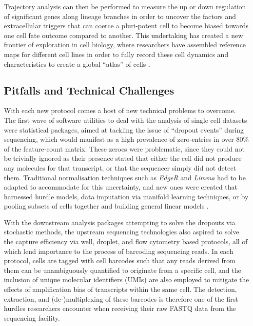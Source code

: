 \documentclass[a4paper,num-refs]{oup-contemporary}
\newcommand{\prog}[1]{\textit{#1}}
\begin{document}
Trajectory analysis can then be performed to measure the up or down regulation of significant genes along lineage branches in order to uncover the factors and extracellular triggers that can coerce a pluri-potent cell to become biased towards one cell fate outcome compared to another. This undertaking has created a new frontier of exploration in cell biology, where researchers have assembled reference maps for different cell lines in order to fully record these cell dynamics and characteristics to create a global ``atlas'' of cells \citep{rozenblatt2017human}.

\subsection{Pitfalls and Technical Challenges}
With each new protocol comes a host of new technical problems to overcome. The first wave of software utilities to deal with the analysis of single cell datasets were statistical packages, aimed at tackling the issue of ``dropout events'' during sequencing, which would manifest as a high prevalence of zero-entries in over 80\% of the feature-count matrix. These zeroes were problematic, since they could not be trivially ignored as their presence stated that either the cell did not produce any molecules for that transcript, or that the sequencer simply did not detect them. Traditional normalisation techniques such as \prog{EdgeR} and \prog{Limma} had to be adapted to accommodate for this uncertainty, and new ones were created that harnessed hurdle models, data imputation via manifold learning techniques, or by pooling subsets of cells together and building general linear models \citep{camara2018methods}.

With the downstream analysis packages attempting to solve the dropouts via stochastic methods, the upstream sequencing technologies also aspired to solve the capture efficiency via well, droplet, and flow cytometry based protocols, all of which lend importance to the process of barcoding sequencing reads. In each protocol, cells are tagged with cell barcodes such that any reads derived from them can be unambiguously quantified to originate from a specific cell, and the inclusion of unique molecular identifiers (UMIs) are also employed to mitigate the effects of amplification bias of transcripts within the same cell. The detection, extraction, and (de-)multiplexing of these barcodes is therefore one of the first hurdles researchers encounter when receiving their raw FASTQ data from the sequencing facility.
\end{document}
